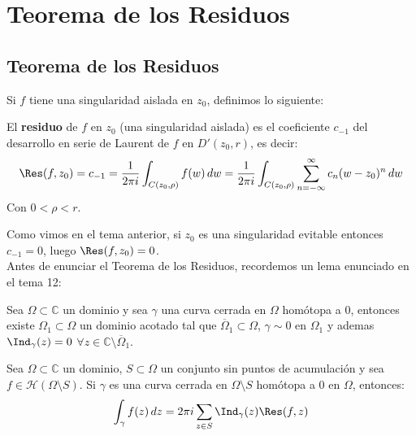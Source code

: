 \section{Teorema de los Residuos}
\subsection{Teorema de los Residuos}

Si $f$ tiene una singularidad aislada en $z_0$, definimos lo siguiente:

\begin{definición}[Residuo]
    El \textbf{residuo} de $f$ en $z_0$ (una singularidad aislada) es el coeficiente $c_{-1}$ del desarrollo en serie de Laurent de $f$ en $D'(z_0,r)$, es decir:
    \[
        \Res(f,z_0) =
        c_{-1} = 
        \frac{1}{2\pi i} \int_{C(z_0,\rho)} f(w) \, dw =
        \frac{1}{2\pi i} \int_{C(z_0,\rho)} \sum_{n=-\infty}^{\infty} c_n (w-z_0)^n \, dw
    \]
    Con $0 < \rho < r$.
\end{definición}

Como vimos en el tema anterior, si $z_0$ es una singularidad evitable entonces $c_{-1} = 0$, luego $\Res(f,z_0) = 0$.\\

Antes de enunciar el Teorema de los Residuos, recordemos un lema enunciado en el tema 12:

\begin{lema}
    Sea $\Omega \subset \mathbb{C}$ un dominio y sea $\gamma$ una curva cerrada en $\Omega$ homótopa a 0, entonces existe $\Omega_1 \subset \Omega$ un dominio acotado tal que $\overline{\Omega}_1 \subset \Omega$, $\gamma \sim 0$ en $\Omega_1$ y ademas $\Ind_\gamma (z) = 0$ $\forall z \in \mathbb{C} \setminus \overline{\Omega}_1$.
\end{lema}

\begin{teorema}
    Sea $\Omega \subset \mathbb{C}$ un dominio, $S \subset \Omega$ un conjunto sin puntos de acumulación y sea $f \in \mathcal{H}(\Omega \setminus S)$. Si $\gamma$ es una curva cerrada en $\Omega \setminus S$ homótopa a 0 en $\Omega$, entonces:
    \[
        \int_{\gamma} f(z) \, dz =
        2 \pi i \sum_{z \in S} \Ind_\gamma (z) \Res(f,z)
    \]
\end{teorema}

